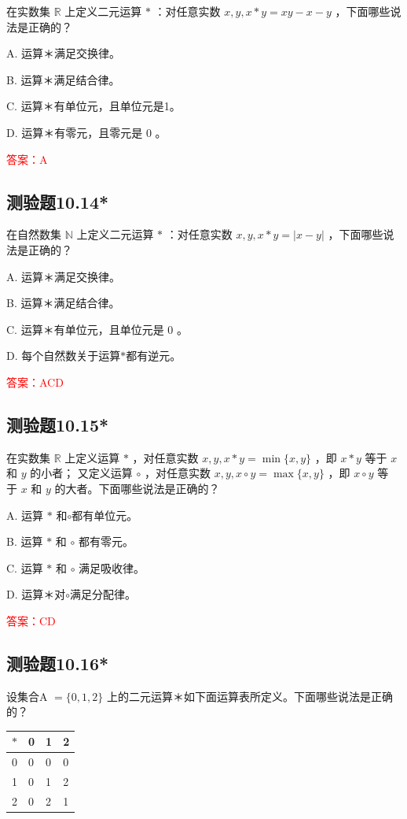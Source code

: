 \documentclass[UTF8, heading=true]{ctexart}
\begin{document}
在实数集 $\mathbb{R}$ 上定义二元运算 $*$ ：对任意实数 $x, y, x * y=x y-x-y$ ，下面哪些说法是正确的？

A. 运算＊满足交换律。

B. 运算＊满足结合律。

C. 运算＊有单位元，且单位元是1。

D. 运算＊有零元，且零元是 0 。

\textcolor{red}{答案：A}

\subsection{测验题10.14*}

在自然数集 $\mathbb{N} $ 上定义二元运算 $*$ ：对任意实数 $x, y, x * y=|x-y|$ ，下面哪些说法是正确的？

A. 运算＊满足交换律。

B. 运算＊满足结合律。

C. 运算＊有单位元，且单位元是 0 。

D. 每个自然数关于运算$*$都有逆元。

\textcolor{red}{答案：ACD}

\subsection{测验题10.15*}

在实数集 $\mathbb{R}$ 上定义运算 $*$ ，对任意实数 $x, y, x * y=\min \{x, y\}$ ，即 $x * y$ 等于 $x$ 和 $y$ 的小者；
又定义运算 $\circ$ ，对任意实数 $x, y, x \circ y=\max \{x, y\}$ ，即 $x \circ y$ 等
于 $x$ 和 $y$ 的大者。下面哪些说法是正确的？

A. 运算 $*$ 和$\circ$都有单位元。

B. 运算 $*$ 和 $\circ$ 都有零元。

C. 运算 $*$ 和 $\circ$ 满足吸收律。

D. 运算＊对$\circ$满足分配律。

\textcolor{red}{答案：CD}

\subsection{测验题10.16*}

设集合A $=\{0,1,2\}$ 上的二元运算＊如下面运算表所定义。下面哪些说法是正确的？

\begin{table}[H]
  \renewcommand{\arraystretch}{1.5}
  \centering
\begin{tabular}{l|lll}
\hline$*$ & 0 & 1 & 2 \\
\hline 0 & 0 & 0 & 0 \\
1 & 0 & 1 & 2 \\
2 & 0 & 2 & 1 \\
\hline
\end{tabular}
\end{table}
\end{document}
